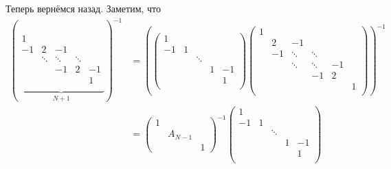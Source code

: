 \documentclass[12pt,a4paper]{article}
\begin{document}
\begin{enumproblem}
        Теперь вернёмся назад. Заметим, что
        \begin{align*}
            \left(
                \underbrace{
                    \begin{matrix}
                        1\\
                        -1& 2& -1\\
                        & \ddots& \ddots& \ddots\\
                        && -1& 2& -1\\
                        &&&& 1\\
                    \end{matrix}
                }_{N+1}
            \right)^{-1}
            &=
            \left(
                \begin{pmatrix}
                    1\\
                    -1& 1&\\
                    && \ddots\\
                    &&& 1& -1\\
                    &&&& 1\\
                \end{pmatrix}
                \begin{pmatrix}
                    1\\
                    & 2& -1\\
                    & -1& \ddots& \ddots\\
                    && \ddots& \ddots& -1\\
                    &&& -1& 2&\\
                    &&&&& 1\\
                \end{pmatrix}
            \right)^{-1}\\
            &=
            \begin{pmatrix}
                1\\
                & A_{N-1}\\
                &&1
            \end{pmatrix}^{-1}
            \begin{pmatrix}
                1\\
                -1& 1\\
                && \ddots\\
                &&& 1& -1\\
                &&&& 1\\

\end{pmatrix}
\end{align*}
\end{enumproblem}
\end{document}
